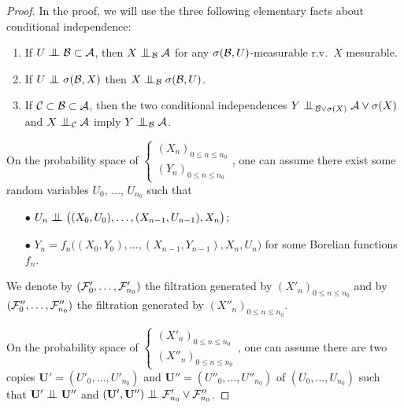 \documentclass[12pt,a4paper]{article}
\begin{document}
\begin{proof}
In the proof, we will use the three following elementary facts about 
conditional independence:
\begin{enumerate}[{\it(i)}]
\item If $U \indep {\cal B} \subset {\cal A}$, 
then $X \indep_\BB {\cal A}$ for any $\sigma({\cal B}, U)$-measurable r.v.\ $X$ mesurable.

\item If $U \indep \sigma({\cal B}, X)$ then $X \indep_\BB \sigma({\cal B}, U)$.

\item If $\mathcal{C} \subset \mathcal{B} \subset {\cal A}$, then 
the two conditional independences $Y \indep_{\BB \vee \sigma(X)} {\cal A} \vee \sigma(X)$
and $X \indep_{\CC} {\cal A}$ imply $Y \indep_{\BB} {\cal A}$.
\end{enumerate}

On the probability space of $\left\{\begin{smallmatrix} {(X_n)}_{0 \leq n \leq n_0} \\ 
{(Y_n)}_{0 \leq n \leq n_0}
\end{smallmatrix}\right.$, one can assume there exist some random variables 
$U_0$, $\ldots$, $U_{n_0}$ such that 
\begin{itemize}
\item[$\bullet$] $U_n \indep \bigl((X_0,U_0), \ldots, (X_{n-1}, U_{n-1}), X_n\bigr)$;

\item[$\bullet$] $Y_n = f_n\bigl((X_0,Y_0), \ldots, (X_{n-1}, Y_{n-1}), X_n, U_n\bigr)$   
for some Borelian functions $f_n$. 
\end{itemize}

We denote by $(\mathcal{F}'_0, \ldots, \mathcal{F}'_{n_0})$ the filtration generated by 
${(X'_n)}_{0 \leq n \leq n_0}$ and by $(\mathcal{F}''_0, \ldots, \mathcal{F}''_{n_0})$ 
the filtration generated by ${(X''_n)}_{0 \leq n \leq n_0}$. 

On the probability space of $\left\{\begin{smallmatrix} {(X'_n)}_{0 \leq n \leq n_0} \\ 
{(X''_n)}_{0 \leq n \leq n_0}
\end{smallmatrix}\right.$, one can assume there are two copies 
$\mathbf{U}'=(U'_0, \ldots, U'_{n_0})$ and $\mathbf{U}''=(U''_0, \ldots, U''_{n_0})$ of 
$(U_0, \ldots, U_{n_0})$ such that $\mathbf{U}' \indep \mathbf{U}''$ and 
$(\mathbf{U}',\mathbf{U}'') \indep \FF'_{n_0} \vee \FF''_{n_0}$. 


\end{proof}
\end{document}
